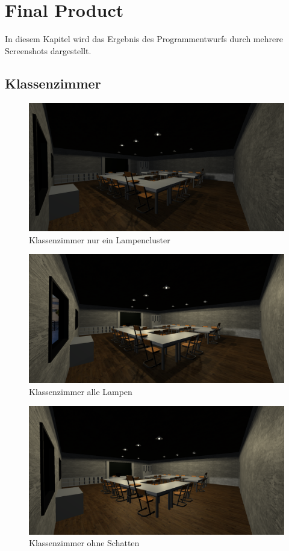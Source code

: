 \section{Final Product}
In diesem Kapitel wird das Ergebnis des Programmentwurfs durch mehrere Screenshots dargestellt.
\subsection{Klassenzimmer}
\begin{figure}[H]
  \centering
  \includegraphics[width=1\textwidth]{images/finalproduct/screenshot_all_shader_only_one_lamp.png}
  \caption{Klassenzimmer nur ein Lampencluster}
  \label{fig:ScreenshotShaderOneLamp}
\end{figure}\noindent
\begin{figure}[H]
  \centering
  \includegraphics[width=1\textwidth]{images/finalproduct/screenshot_all_shader.png}
  \caption{Klassenzimmer alle Lampen}
  \label{fig:ScreenshotShaderAllLamp}
\end{figure}\noindent
\begin{figure}[H]
  \centering
  \includegraphics[width=1\textwidth]{images/finalproduct/screenshot_no_shader.png}
  \caption{Klassenzimmer ohne Schatten}
  \label{fig:ScreenshotNoShaderAllLamp}
\end{figure}\noindent
